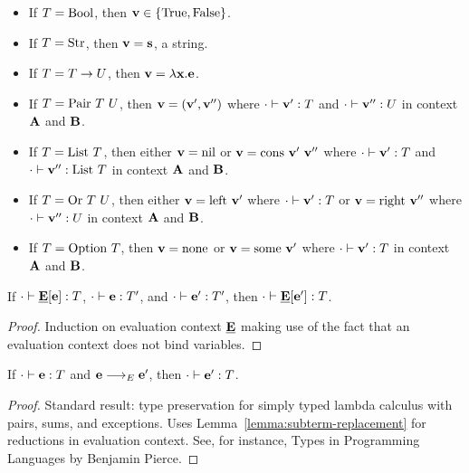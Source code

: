 \begin{lemma}
\begin{itemize}
  \item If $T = \text{Bool}$, then $\textbf{v} \in \{ \text{True}, \text{False}\}$.
  \item If $T = \text{Str}$, then $\textbf{v} = \textbf{s}$, a string.
  \item If $T = T\to U$, then $\textbf{v} = \lambda
    \textbf{x}. \textbf{e}$. 
  \item If $\TYPE = \TPAIR\ \TYPE\ \TYPEU$, then $\textbf{v} = (\textbf{v}',
    \textbf{v}'')$ where $\cdot \vdash \textbf{v}' : T$ and $\cdot \vdash \textbf{v}'' : U$ in context $\textbf{A}$ and $\textbf{B}$.
  \item If $T = \text{List}\ T$, then either $\textbf{v} = \text{nil}$ or $\textbf{v}
    = \text{cons}\ {\textbf{v}'}\ {\textbf{v}''}$ where $\cdot \vdash \textbf{v}' : T$
    and $\cdot \vdash \textbf{v}'' : \text{List}\ T$ in context
    $\textbf{A}$ and $\textbf{B}$.
  \item If $\TYPE = \TSUM\ \TYPE\ \TYPEU$, then either $\textbf{v} = \text{left}\
    \textbf{v}'$ where $\cdot \vdash \textbf{v}' : T$ or $\textbf{v}= \text{right}\
    \textbf{v}''$ where $\cdot \vdash \textbf{v}'' : U$ in context
    $\textbf{A}$ and $\textbf{B}$.
  \item If $T = \text{Option}\ T$, then $\textbf{v} = \text{none}$ or $\textbf{v} =
    \text{some}\ \textbf{v}'$ where $\cdot \vdash \textbf{v}' : T$ in context
    $\textbf{A}$ and $\textbf{B}$.
  \end{itemize}
\end{lemma}

\begin{lemma}\label{lemma:subterm-replacement}
  If $\cdot \vdash  \underline{\textbf{E}}[\textbf{e}] : T$,
  $\cdot \vdash \textbf{e} : T'$, and
  $\cdot \vdash \textbf{e}' : T'$, then
  $\cdot \vdash  \underline{\textbf{E}}[\textbf{e}'] : T$.
\end{lemma}
\begin{proof}
  Induction on evaluation context $\underline{\textbf{E}}$ making use of the fact that
  an evaluation context does not bind variables.
\end{proof}

\begin{lemma}\label{lemma:type-preservation-expressions}
  If $\cdot \vdash  \textbf{e} : T$ and $\textbf{e} \stackrel{{}}\longrightarrow_E \textbf{e}'$,
  then  $\cdot \vdash  \textbf{e}' : T$.
\end{lemma}
\begin{proof}
  Standard result: type preservation for simply typed lambda calculus
  with pairs, sums, and exceptions. Uses
  Lemma~\ref{lemma:subterm-replacement} for reductions in evaluation
  context. See, for instance, Types in
  Programming Languages by Benjamin Pierce.
\end{proof}

